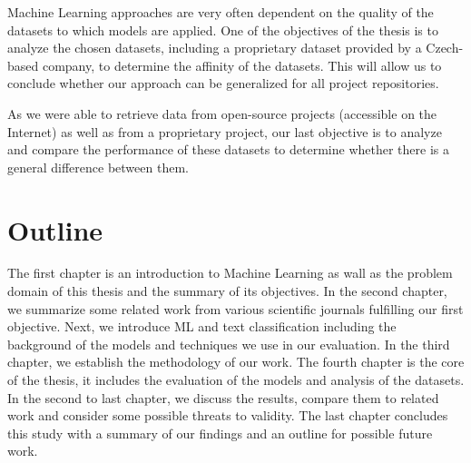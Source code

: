 Machine Learning approaches are very often dependent on the quality of the datasets to which models are applied. One of the objectives of the thesis is to analyze the chosen datasets, including a proprietary dataset provided by a Czech-based company, to determine the affinity of the datasets. This will allow us to conclude whether our approach can be generalized for all project repositories.

As we were able to retrieve data from open-source projects (accessible on the Internet) as well as from a proprietary project, our last objective is to analyze and compare the performance of these datasets to determine whether there is a general difference between them. 

\section{Outline}

The first chapter is an introduction to Machine Learning as wall as the problem domain of this thesis and the summary of its objectives. In the second chapter, we summarize some related work from various scientific journals fulfilling our first objective. Next, we introduce ML and text classification including the background of the models and techniques we use in our evaluation. In the third chapter, we establish the methodology of our work. The fourth chapter is the core of the thesis, it includes the evaluation of the models and analysis of the datasets. In the second to last chapter, we discuss the results, compare them to related work and consider some possible threats to validity. The last chapter concludes this study with a summary of our findings and an outline for possible future work.